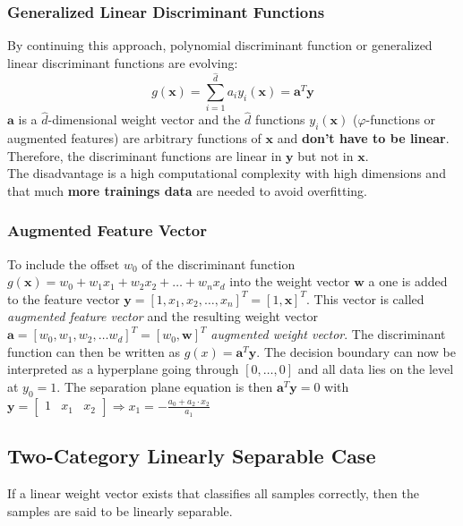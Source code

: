 \begin{multicols}{2}
   	   \subsubsection{Generalized Linear Discriminant Functions}
   	     By continuing this approach, polynomial discriminant function or generalized linear discriminant 
   	     functions are evolving: 
   	     $$g(\bm x) = \sum\limits_{i=1}^{\hat d} a_i y_i(\bm x) = \bm a^T \bm y$$
   	     $\bm a$ is a 
   	     $\hat d$-dimensional weight vector and the $\hat d$ functions $y_i(\bm x)$ ($\varphi$-functions 
   	     or augmented features) are arbitrary functions of $\bm x$ and \textbf{don't have to be linear}.
   	     Therefore, the discriminant functions are linear in $\bm y$ but not in $\bm x$.\\
   	     The disadvantage is a high computational complexity with high dimensions and that much 
   	     \textbf{more trainings data} are needed to avoid overfitting.
   	     
    \subsubsection{Augmented Feature Vector}
      To include the offset $w_0$ of the discriminant function $g(\bm x) = w_0 + w_1 x_1 + w_2 x_2 + \ldots + w_n x_d$ into the weight vector $\bm w$ 
      a one is added to the feature vector  $\bm y = [1, x_1, x_2, \ldots, x_n]^T = [1, \bm x]^T$.
      This vector is called \emph{augmented feature vector} and the resulting weight vector $\bm a = [w_0, w_1, w_2, \ldots w_d]^T = [w_0, \bm w]^T$  \emph{augmented
      weight vector}.
      The discriminant function can then be written as $g(x) = \mathbf{a}^T \mathbf{y}$.
      The decision boundary can now be interpreted as a hyperplane going through $[0,\ldots,0]$ and 
      all data lies on the level at $y_0=1$.
      The separation plane equation is then $\mathbf{a}^T \mathbf{y} = 0$ with $\mathbf{y} = \begin{bmatrix}1 & x_1& x_2\end{bmatrix} \Rightarrow x_1=-\frac{a_0 + a_2\cdot x_2}{a_1}$
  \end{multicols}      


   
  \subsection{Two-Category Linearly Separable Case}

    If a linear weight vector exists that classifies all samples correctly, then the samples
    are said to be linearly separable.

